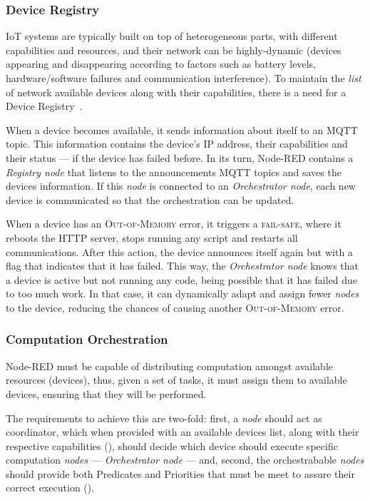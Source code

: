 \subsubsection{Device Registry}
\label{sec:registry}

IoT systems are typically built on top of heterogeneous parts, with different capabilities and resources, and their network can be highly-dynamic (devices appearing and disappearing according to factors such as battery levels, hardware/software failures and communication interference). To maintain the \textit{list} of network available devices along with their capabilities, there is a need for a Device Registry~\cite{Ramadas17}.

When a device becomes available, it sends information about itself to an MQTT topic. This information contains the device's IP address, their capabilities and their status --- if the device has failed before. In its turn, Node-RED contains a \textit{Registry node} that listens to the announcements MQTT topics and saves the devices information. If this \textit{node} is connected to an \textit{Orchestrator node}, each new device is communicated so that the orchestration can be updated.

When a device has an \textsc{Out-of-Memory} error, it triggers a \textsc{fail-safe}, where it reboots the HTTP server, stops running any script and restarts all communications. After this action, the device announces itself again but with a flag that indicates that it has failed. This way, the \textit{Orchestrator node} knows that a device is active but not running any code, being possible that it has failed due to too much work. In that case, it can dynamically adapt and assign fewer \textit{nodes} to the device, reducing the chances of causing another \textsc{Out-of-Memory} error.

\subsubsection{Computation Orchestration}\label{sec:node_red_computation_decentralization}

Node-RED must be capable of distributing computation amongst available resources (\ie devices), thus, given a set of tasks, it must assign them to available devices, ensuring that they will be performed.

The requirements to achieve this are two-fold: first, a \textit{node} should act as coordinator, which when provided with an available devices list, along with their respective capabilities (\cf {}), should decide which device should execute specific computation \textit{nodes} --- \textit{Orchestrator node} --- and, second, the orchestrabable \textit{nodes} should provide both Predicates and Priorities that must be meet to assure their correct execution (\cf {}).

